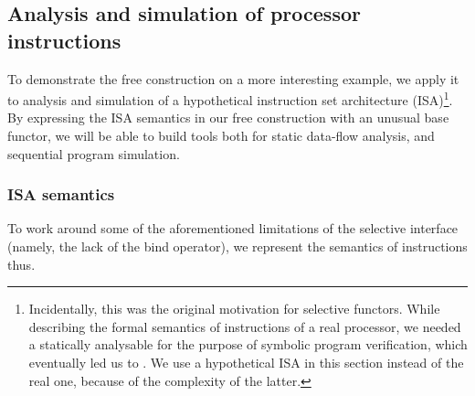 




\subsection{Analysis and simulation of processor instructions}\label{sec-free-isa}

To demonstrate the free construction on a more interesting example, we apply it
to analysis and simulation of a hypothetical instruction set architecture
(ISA)\footnote{Incidentally, this was the original motivation for selective
functors. While describing the formal semantics of instructions of a real
processor, we needed a statically analysable  for the purpose of
symbolic program verification, which eventually led us to . We use a
hypothetical ISA in this section instead of the real one, because of the
complexity of the latter.}. By expressing the ISA semantics in our
free construction with an unusual base functor, we will be able to build
tools both for static data-flow analysis, and sequential program simulation.

\subsubsection{ISA semantics}

To work around some of the aforementioned limitations of the selective
interface (namely, the lack of the bind operator), we represent the semantics of
instructions thus.

